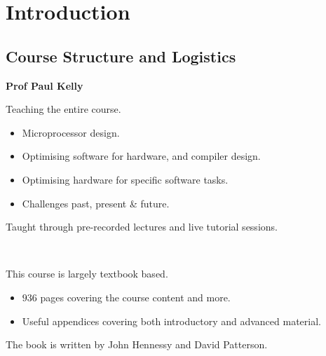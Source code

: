 \chapter{Introduction}
\section{Course Structure and Logistics}
\begin{minipage}{.3\textwidth}
    \begin{center}
        \centerline{\textbf{Prof Paul Kelly}}
    \end{center}    
\end{minipage}
\hfill
\begin{minipage}{.68\textwidth}
    Teaching the entire course.
    \begin{itemize}
        \item Microprocessor design.
        \item Optimising software for hardware, and compiler design.
        \item Optimising hardware for specific software tasks.
        \item Challenges past, present \& future.
    \end{itemize}
    Taught through pre-recorded lectures and live tutorial sessions.
\end{minipage}
\\ \begin{minipage}{.63\textwidth}
    This course is largely textbook based.
    \begin{itemize}
        \item $936$ pages covering the course content and more.
        \item Useful appendices covering both introductory and advanced material.
    \end{itemize}
    The book is written by John Hennessy and David Patterson.
\end{minipage}

